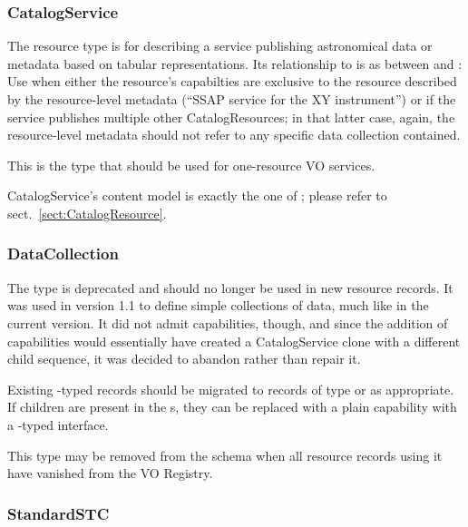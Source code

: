 \documentclass[11pt,a4paper]{ivoa}
\begin{document}


\subsubsection{CatalogService}

The  resource type is for describing a
service publishing astronomical data or metadata based on tabular
representations.  Its relationship to 
is as between 
and : Use  when either
the resource's capabilties are exclusive to the resource described by
the resource-level metadata (``SSAP service for the XY instrument'') or
if the service publishes multiple other CatalogResources; in that latter
case, again, the resource-level metadata should not refer to any
specific data collection contained.

This is the type that should be used for one-resource VO
services.

CatalogService's content model is exactly the one of
; please refer to sect.~\ref{sect:CatalogResource}.

\subsubsection{DataCollection}
\label{sect:datacollection}

The  type is deprecated and should no longer be
used in new resource records.  It was used in version 1.1 to define
simple collections of data, much like  in the
current version.  It did not admit capabilities, though, and since the
addition of capabilities would essentially have created a CatalogService
clone with a different child sequence, it was decided to abandon rather
than repair it.

Existing -typed
records should be migrated to records of type  or
 as appropriate.  If 
children are present in the
\/s,
they can be replaced with a plain capability with a
-typed interface.

This type may be removed from the schema when all resource records using
it have vanished from the VO Registry.

\subsubsection{StandardSTC}
\end{document}
